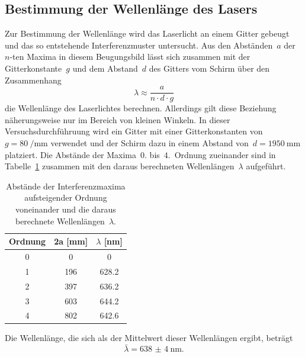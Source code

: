 \subsection{Bestimmung der Wellenlänge des Lasers}
%
Zur Bestimmung der Wellenlänge wird das Laserlicht an einem Gitter gebeugt und das so entstehende Interferenzmuster untersucht.
Aus den Abständen~$a$ der~$n$-ten Maxima in diesem Beugungsbild lässt sich zusammen mit der Gitterkonstante~$g$ und dem Abstand~$d$ des
Gitters vom Schirm über den Zusammenhang
%
\begin{equation}
  \lambda\approx\frac{a}{n\cdot d\cdot g}
\end{equation}
%
die Wellenlänge des Laserlichtes berechnen. Allerdings gilt diese Beziehung näherungsweise nur im Bereich von kleinen Winkeln. In dieser
Versuchsdurchführuung wird ein Gitter mit einer Gitterkonstanten von~$g=\SI{80}{\per\milli\meter}$ verwendet und der Schirm dazu in einem Abstand
von~$d=\SI{1950}{\milli\meter}$ platziert. Die Abstände der Maxima~$0.$ bis~$4.$~Ordnung zueinander sind in Tabelle~\ref{tab:wellenlaenge} zusammen mit
den daraus berechneten Wellenlängen~$\lambda$ aufgeführt.
%
\begin{table}
  \centering
  \caption{Abstände der Interferenzmaxima aufsteigender Ordnung voneinander und die daraus berechnete Wellenlängen~$\lambda$.}
  \begin{tabular}{ccc}
    \toprule
    {Ordnung}  & {2a [mm]} & {$\lambda$ [nm]} \\
		\midrule
	  \SI{0 }{} & \SI{  0}{} & \SI{  0}{} \\
    \SI{1 }{} & \SI{196}{} & \SI{628.2}{} \\
		\SI{2 }{} & \SI{397}{} & \SI{636.2}{} \\
		\SI{3 }{} & \SI{603}{} & \SI{644.2}{} \\
		\SI{4 }{} & \SI{802}{} & \SI{642.6}{} \\
    \bottomrule
	\end{tabular}
  \label{tab:wellenlaenge}
\end{table}
%
Die Wellenlänge, die sich als der Mittelwert dieser Wellenlängen ergibt, beträgt
%
\begin{equation}
  \bar{\lambda}=\SI{638(4)}{\nano\meter}.
\end{equation}
